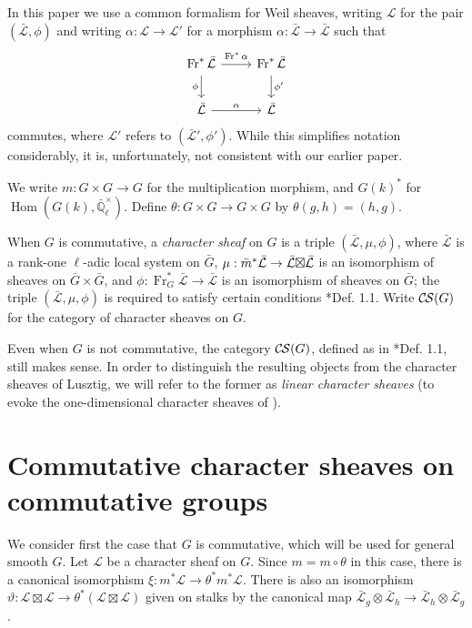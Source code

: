 \documentclass[10pt]{amsart}
\theoremstyle{plain}
\theoremstyle{definition}
\newcommand{\EE}{\mathbb{\bar Q}_\ell}
\newcommand{\EEx}{\EE^\times}
\newcommand{\Frob}[1]{\operatorname{Fr}_{#1}}
\DeclareMathOperator{\Hom}{Hom}
\newcommand{\cs}[1]{{\mathcal{#1}}}
\newcommand{\gcs}[1]{{\mathcal{\bar #1}}}
\newcommand{\CS}{{\mathcal{C\hskip-0.8pt S}}}
\newcommand{\bm}{\bar{m}}
\newcommand{\bG}{\bar{G}}
\newcommand{\tight}[3]{\hspace{-#1pt}{#2}\hspace{-#3pt}}
\newcommand{\LxL}{\text{$\gcs{L} \tight{0}{\boxtimes}{0} \gcs{L}$}}
\begin{document}
In this paper we use a common formalism for Weil sheaves, writing $\cs{L}$ for the pair $(\gcs{L},\phi)$ and writing $\alpha : \cs{L} \to \cs{L}'$ for a morphism $\alpha : \gcs{L} \to \gcs{L}$ such that 
\[
\begin{tikzcd}
\Frob{}^* \gcs{L} \arrow{d}[swap]{\phi} \arrow{r}{\Frob{}^*\alpha} &  \Frob{}^* \gcs{L} \arrow{d}{\phi'}\\
\gcs{L} \arrow{r}{\alpha} & \gcs{L}
\end{tikzcd}
\]
commutes, where $\cs{L}'$ refers to $(\gcs{L}',\phi')$.
While this simplifies notation considerably, it is, unfortunately, not consistent with our earlier paper.

We write $m : G \times G \to G$ for the multiplication morphism, and $G(k)^*$ for $\Hom(G(k), \EEx)$.
Define $\theta : G\times G \to G\times G$ by $\theta(g,h) = (h,g)$.

When $G$ is commutative, a \emph{character sheaf} on $G$ is a triple $(\gcs{L}, \mu, \phi)$,
where $\gcs{L}$ is a rank-one $\ell$-adic local system on $\bG$, 
$\mu : \bm^* \gcs{L} \to \LxL$ is an isomorphism
of sheaves on $\bG \times \bG$, 
and $\phi : \Frob{G}^* \gcs{L} \to \gcs{L}$ is an isomorphism of sheaves on $\bG$;
the triple $(\gcs{L}, \mu, \phi)$ is required to satisfy certain conditions \cite{cunningham-roe:13a}*{Def. 1.1}.
Write $\CS(G)$ for the category of character sheaves on $G$.

Even when $G$ is not commutative, the category $\CS(G)$, defined as in \cite{cunningham-roe:13a}*{Def. 1.1},
still makes sense.  In order to distinguish the resulting objects from
the character sheaves of Lusztig, we will refer to the former as \emph{linear character sheaves}
(to evoke the one-dimensional character sheaves of \cite{kamgarpour:09a}).

\section{Commutative character sheaves on commutative groups}\label{sec:comcom}

We consider first the case that $G$ is commutative, which will be used for general smooth $G$.
Let $\cs{L}$ be a character sheaf on $G$.  Since $m = m \circ \theta$ in this case,
there is a canonical isomorphism $\xi : m^* \cs{L} \to \theta^* m^* \cs{L}$.
There is also an isomorphism $\vartheta : \cs{L}\boxtimes\cs{L} \to \theta^*(\cs{L}\boxtimes\cs{L})$
given on stalks by the canonical map $\gcs{L}_{g} \otimes \gcs{L}_{h} \to \gcs{L}_{h} \otimes \gcs{L}_{g}$.
\end{document}

